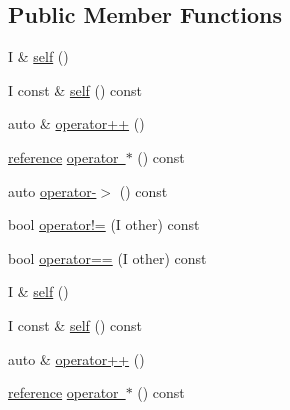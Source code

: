 \subsection*{Public Member Functions}
\begin{DoxyCompactItemize}
\item 
I \& \mbox{\hyperlink{structrah_1_1iterator__facade_3_01_i_00_01_r_00_01std_01_1_1forward__iterator__tag_01_4_a33b9b1880a99615f59a9c9ab653b083e}{self}} ()
\item 
I const  \& \mbox{\hyperlink{structrah_1_1iterator__facade_3_01_i_00_01_r_00_01std_01_1_1forward__iterator__tag_01_4_addc54ad790aa07a1467e3e4a50d60864}{self}} () const
\item 
auto \& \mbox{\hyperlink{structrah_1_1iterator__facade_3_01_i_00_01_r_00_01std_01_1_1forward__iterator__tag_01_4_a7b4c5ce92d8f683e63d1fce16c1acd13}{operator++}} ()
\item 
\mbox{\hyperlink{structrah_1_1iterator__facade_3_01_i_00_01_r_00_01std_01_1_1forward__iterator__tag_01_4_afc82a925c7d3fa3959bc9e8fc96dc582}{reference}} \mbox{\hyperlink{structrah_1_1iterator__facade_3_01_i_00_01_r_00_01std_01_1_1forward__iterator__tag_01_4_afa0ea1baac6413bf9ef210515e0bf14b}{operator $\ast$}} () const
\item 
auto \mbox{\hyperlink{structrah_1_1iterator__facade_3_01_i_00_01_r_00_01std_01_1_1forward__iterator__tag_01_4_a3475cf08817d983a6ca49694e08ce600}{operator-\/$>$}} () const
\item 
bool \mbox{\hyperlink{structrah_1_1iterator__facade_3_01_i_00_01_r_00_01std_01_1_1forward__iterator__tag_01_4_a57054448d43f42e55f56d57d4fcf6ca1}{operator!=}} (I other) const
\item 
bool \mbox{\hyperlink{structrah_1_1iterator__facade_3_01_i_00_01_r_00_01std_01_1_1forward__iterator__tag_01_4_a6fd9be033e6914adcca8da044606eff2}{operator==}} (I other) const
\item 
I \& \mbox{\hyperlink{structrah_1_1iterator__facade_3_01_i_00_01_r_00_01std_01_1_1forward__iterator__tag_01_4_a33b9b1880a99615f59a9c9ab653b083e}{self}} ()
\item 
I const  \& \mbox{\hyperlink{structrah_1_1iterator__facade_3_01_i_00_01_r_00_01std_01_1_1forward__iterator__tag_01_4_addc54ad790aa07a1467e3e4a50d60864}{self}} () const
\item 
auto \& \mbox{\hyperlink{structrah_1_1iterator__facade_3_01_i_00_01_r_00_01std_01_1_1forward__iterator__tag_01_4_a7b4c5ce92d8f683e63d1fce16c1acd13}{operator++}} ()
\item 
\mbox{\hyperlink{structrah_1_1iterator__facade_3_01_i_00_01_r_00_01std_01_1_1forward__iterator__tag_01_4_afc82a925c7d3fa3959bc9e8fc96dc582}{reference}} \mbox{\hyperlink{structrah_1_1iterator__facade_3_01_i_00_01_r_00_01std_01_1_1forward__iterator__tag_01_4_afa0ea1baac6413bf9ef210515e0bf14b}{operator $\ast$}} () const

\end{DoxyCompactItemize}
